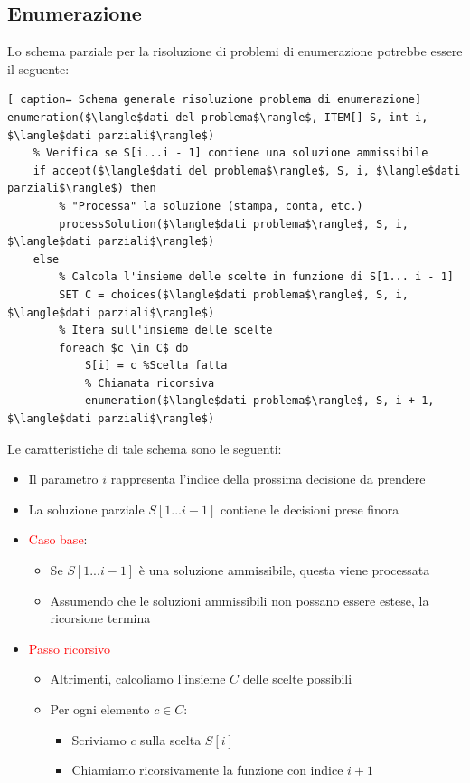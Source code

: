 \documentclass[../cheatSheetAlgoritmi.tex]{subfiles}
\begin{document}
\subsection{Enumerazione}
Lo schema parziale per la risoluzione di problemi di enumerazione potrebbe essere il seguente: 
 \begin{lstlisting}[ caption= Schema generale risoluzione problema di enumerazione]
enumeration($\langle$dati del problema$\rangle$, ITEM[] S, int i, $\langle$dati parziali$\rangle$)
	% Verifica se S[i...i - 1] contiene una soluzione ammissibile
	if accept($\langle$dati del problema$\rangle$, S, i, $\langle$dati parziali$\rangle$) then
		% "Processa" la soluzione (stampa, conta, etc.)
		processSolution($\langle$dati problema$\rangle$, S, i, $\langle$dati parziali$\rangle$)
	else
		% Calcola l'insieme delle scelte in funzione di S[1... i - 1]
		SET C = choices($\langle$dati problema$\rangle$, S, i, $\langle$dati parziali$\rangle$)
		% Itera sull'insieme delle scelte
		foreach $c \in C$ do
			S[i] = c %Scelta fatta
			% Chiamata ricorsiva
			enumeration($\langle$dati problema$\rangle$, S, i + 1, $\langle$dati parziali$\rangle$)
\end{lstlisting}
Le caratteristiche di tale schema sono le seguenti: 
\begin{itemize}
	\item Il parametro $i$ rappresenta l'indice della prossima decisione da prendere
	\item La soluzione parziale $S[1...i - 1]$ contiene le decisioni prese finora
	\item \textcolor{red}{Caso base}:
	\begin{itemize}
		\item Se $S[1... i - 1]$ è una soluzione ammissibile, questa viene processata
		\item Assumendo che le soluzioni ammissibili non possano essere estese, la ricorsione termina
	\end{itemize}
	\item \textcolor{red}{Passo ricorsivo}
	\begin{itemize}
		\item Altrimenti, calcoliamo l’insieme $C$ delle scelte possibili
		\item Per ogni elemento $c \in C$:
		\begin{itemize}
			\item Scriviamo $c$ sulla scelta $S[i]$
			\item Chiamiamo ricorsivamente la funzione con indice $i+ 1$
		\end{itemize}
	\end{itemize}
\end{itemize}
\end{document}
